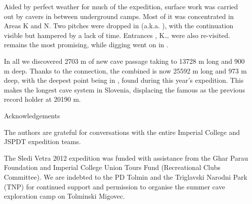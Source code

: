 Aided by perfect weather for much of the expedition, surface work was
carried out by cavers in between underground camps. Most of it was
concentrated in Areas K and N. Two pitches were dropped in  (a.k.a.
), with the continuation visible but hampered by a lack of time.
Entrances , K\ldots{} were also re-visited.  remains the most
promising, while digging went on in .

In all we discovered 2703 m of new cave passage taking 
to 13728 m long and 900 m deep. Thanks to the connection, the combined
 is now 25592 m long and 973 m deep, with the deepest
point being  in , found during this
year's expedition. This makes  the longest cave system in
Slovenia, displacing the famous  as the previous record
holder at 20190 m.

Acknowledgements

The authors are grateful for conversations with the entire Imperial
College and JSPDT expedition teams.

The Sledi Vetra 2012 expedition was funded with assistance from the Ghar
Parau Foundation and Imperial College Union Tours Fund (Recreational
Clubs Committee). We are indebted to the PD Tolmin and the Triglavski
Narodni Park (TNP) for continued support and permission to organise the
summer cave exploration camp on Tolminski Migovec.
